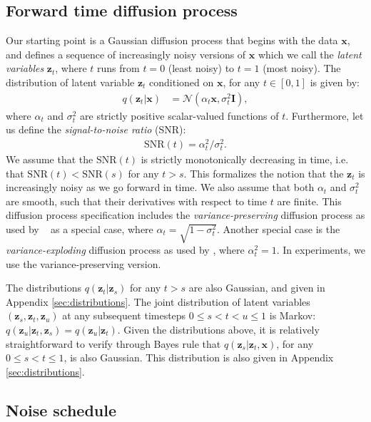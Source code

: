 \documentclass{article}
\def\rvx{{\mathbf{x}}}
\def\rvz{{\mathbf{z}}}
\newcommand{\bfI}{\mathbf{I}}
\newcommand{\snr}{\text{SNR}}
\begin{document}
\subsection{Forward time diffusion process}\label{sec:inferencemodel}
Our starting point is a Gaussian diffusion process that begins with the data $\rvx$, and defines a sequence of increasingly noisy versions of $\rvx$ which we call the \emph{latent variables} $\rvz_t$, where $t$ runs from $t=0$ (least noisy) to $t=1$ (most noisy).
The distribution of latent variable $\rvz_t$ conditioned on $\rvx$, for any $t \in [0,1]$ is given by:
\begin{align}
q(\rvz_t|\rvx) &= \mathcal{N}\left(\alpha_t \rvx, \sigma^2_t \bfI\right),
\label{eq:zt_given_x}
\end{align}
where  $\alpha_t$ and $\sigma^{2}_t$ are strictly positive scalar-valued functions of $t$. Furthermore, let us define the \emph{signal-to-noise ratio} (SNR): \begin{align}
    \snr(t) = \alpha^2_t / \sigma^2_t.
\end{align}
We assume that the $\snr(t)$ is strictly monotonically decreasing in time, i.e. that $\snr(t) < \snr(s)$ for any $t > s$. This formalizes the notion that the $\rvz_t$ is increasingly noisy as we go forward in time. We also assume that both $\alpha_{t}$ and $\sigma^{2}_t$ are smooth, such that their derivatives with respect to time $t$ are finite.  This diffusion process specification includes the \emph{variance-preserving} diffusion process as used by ~\citep{sohl2015deep,ho2020denoising} as a special case, where $\alpha_t = \sqrt{1 - \sigma^2_t}$. Another special case is the \emph{variance-exploding} diffusion process as used by \citep{song2019generative,song2020score}, where $\alpha^2_t = 1$. In experiments, we use the variance-preserving version.

The distributions $q(\rvz_t|\rvz_s)$ for any $t > s$ are also Gaussian, and given in Appendix \ref{sec:distributions}. The joint distribution of latent variables $(\rvz_s, \rvz_t, \rvz_u)$ at any subsequent timesteps $0 \leq s < t < u \leq 1$ is Markov: $q(\rvz_u | \rvz_t, \rvz_s) = q(\rvz_u | \rvz_t)$. Given the distributions above, it is relatively straightforward to verify through Bayes rule that $q(\rvz_s|\rvz_t,\rvx)$, for any $0 \leq s < t \leq 1$, is also Gaussian. This distribution is also given in Appendix \ref{sec:distributions}. 

\subsection{Noise schedule}
\label{sec:learning_noise}
\end{document}
